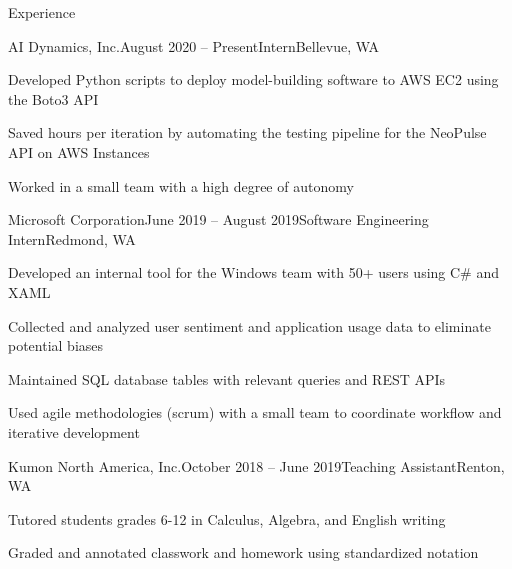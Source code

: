 \documentclass{resume} %
\begin{document}
\begin{rSection}{Experience}

\begin{rSubsection}{AI Dynamics, Inc.}{August 2020 – Present}{Intern}{Bellevue, WA}
\item Developed Python scripts to deploy model-building software to AWS EC2 using the Boto3 API
\item Saved hours per iteration by automating the testing pipeline for the NeoPulse API on AWS Instances
\item Worked in a small team with a high degree of autonomy
\end{rSubsection}

\begin{rSubsection}{Microsoft Corporation}{June 2019 – August 2019}{Software Engineering Intern}{Redmond, WA}
\item Developed an internal tool for the Windows team with 50+ users using C\# and XAML
\item Collected and analyzed user sentiment and application usage data to eliminate potential biases
\item Maintained SQL database tables with relevant queries and REST APIs
\item Used agile methodologies (scrum) with a small team to coordinate workflow and iterative development
\end{rSubsection}

\begin{rSubsection}{Kumon North America, Inc.}{October 2018 – June 2019}{Teaching Assistant}{Renton, WA}
\item Tutored students grades 6-12 in Calculus, Algebra, and English writing
\item Graded and annotated classwork and homework using standardized notation
\end{rSubsection}

\end{rSection}

\end{document}
